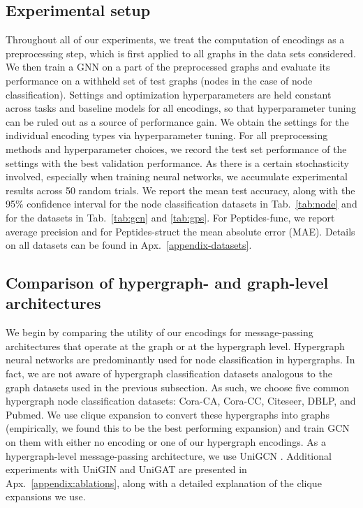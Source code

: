 \subsection{Experimental setup}
Throughout all of our experiments, we treat the computation of encodings as a preprocessing step, which is first applied to all graphs in the data sets considered. We then train a GNN on a part of the preprocessed graphs and evaluate its performance on a withheld set of test graphs (nodes in the case of node classification). Settings and optimization hyperparameters are held constant across tasks and baseline models for all encodings, so that hyperparameter tuning can be ruled out as a source of performance gain. We obtain the settings for the individual encoding types via hyperparameter tuning. For all preprocessing methods and hyperparameter choices, we record the test set performance of the settings with the best validation performance. As there is a certain stochasticity involved, especially when training neural networks, we accumulate experimental results across 50 random trials. We report the mean test accuracy, along with the 95$\%$ confidence interval for the node classification datasets in Tab.~\ref{tab:node} and for the datasets in Tab.~\ref{tab:gcn} and \ref{tab:gps}. For Peptides-func, we report average precision and for Peptides-struct the mean absolute error (MAE). Details on all datasets can be found in Apx.~\ref{appendix-datasets}.


\subsection{Comparison of hypergraph- and graph-level architectures}
We begin by comparing the utility of our encodings for message-passing architectures that operate at the graph or at the hypergraph level. Hypergraph neural networks are predominantly used for node classification in hypergraphs. In fact, we are not aware of hypergraph classification datasets analogous to the graph datasets used in the previous subsection. As such, we choose five common hypergraph node classification datasets: Cora-CA, Cora-CC, Citeseer, DBLP, and Pubmed. We use clique expansion to convert these hypergraphs into graphs (empirically, we found this to be the best performing expansion) and train GCN on them with either no encoding or one of our hypergraph encodings. As a hypergraph-level message-passing architecture, we use UniGCN \citep{huang2021unignn}. Additional experiments with UniGIN and UniGAT are presented in Apx.~\ref{appendix:ablations}, along with a detailed explanation of the clique expansions we use.\\

